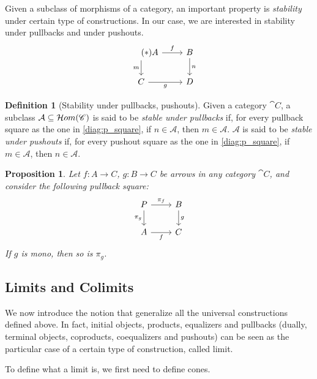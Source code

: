 \documentclass[a4paper, twoside,openright]{report}
\theoremstyle{plain}
\newtheorem{prop}[theorem]{Proposition}
\theoremstyle{definition}
\newtheorem{definition}[theorem]{Definition}
\begin{document}
Given a subclass of morphisms of a category, an important property is \emph{stability} under certain type of constructions. In our case, we are interested in stability under pullbacks and under pushouts.
\[
    \begin{tikzcd}\label{diag:p_square}\tag{$\ast$}
        A \arrow[r, "f"] \arrow[d, "m"swap] & B \arrow[d, "n"] \\
        C \arrow[r, "g" swap] & D
    \end{tikzcd}
\]

\begin{definition}[Stability under pullbacks, pushouts]\label{def:stab_under_pb_po}
    Given a category $\cat C$, a subclass $\mathcal{A} \subseteq \mathcal{H}om(\mathscr{C})$ is said to be \emph{stable under pullbacks} if, for every pullback square as the one in \eqref{diag:p_square}, if $n \in \mathcal{A}$, then $m \in \mathcal{A}$.
    $\mathcal A$ is said to be \emph{stable under pushouts} if, for every pushout square as the one in \eqref{diag:p_square}, if $m \in \mathcal{A}$, then $n \in \mathcal{A}$.
\end{definition}

\begin{prop}\label{prop:monos_pres_by_pullback}
    Let $f: A \rightarrow C$, $g: B \rightarrow C$ be arrows in any category $\cat C$, and consider the following pullback square:
    \[
        \begin{tikzcd}
            P \arrow[r, "{\pi_f}"] \arrow[d, "{\pi_g}"swap] & B \arrow[d, "g"] \\
            A \arrow[r, "f"swap] & C
        \end{tikzcd}
    \]
    If $g$ is mono, then so is $\pi_g$.
\end{prop}


\subsection{Limits and Colimits}

We now introduce the notion that generalize all the universal constructions defined above. In fact, initial objects, products, equalizers and pullbacks (dually, terminal objects, coproducts, coequalizers and pushouts) can be seen as the particular case of a certain type of construction, called limit.

To define what a limit is, we first need to define cones.
\end{document}
